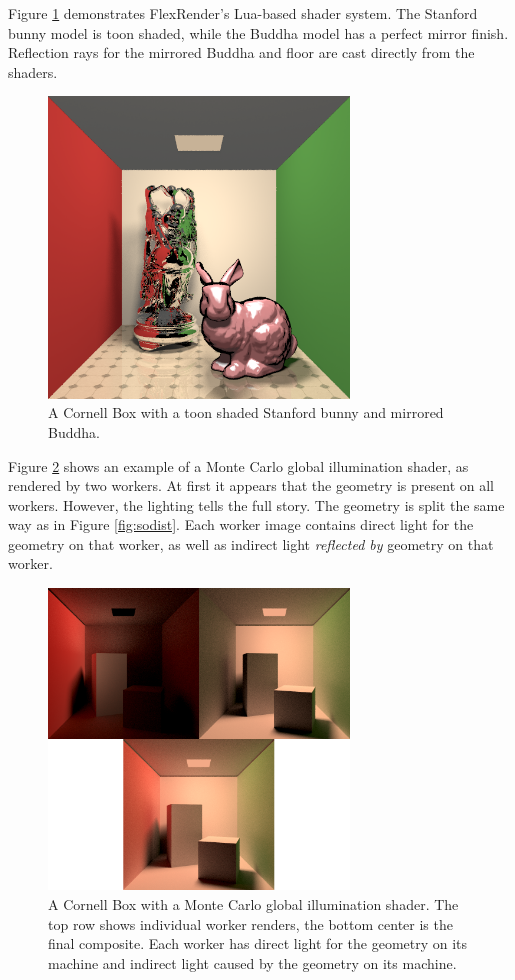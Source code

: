 \documentclass[a4paper,twoside]{article}
\begin{document}
Figure \ref{fig:socornell} demonstrates FlexRender's Lua-based shader system. The
Stanford bunny model is toon shaded, while the Buddha model has a perfect mirror
finish. Reflection rays for the mirrored Buddha and floor are cast directly
from the shaders.

\begin{figure}[h!]
    \centering
    \includegraphics[width=80mm]{showoff/cornell-models.png}
    \caption{A Cornell Box with a toon shaded Stanford bunny and mirrored Buddha.}
    \label{fig:socornell}
\end{figure}

Figure \ref{fig:sogi} shows an example of a Monte Carlo global illumination shader,
as rendered by two workers. At first it appears that the geometry is present on
all workers. However, the lighting tells the full story. The geometry is split
the same way as in Figure \ref{fig:sodist}. Each worker image contains direct
light for the geometry on that worker, as well as indirect light \emph{reflected by}
geometry on that worker.

\begin{figure}[h!]
    \centering
    \includegraphics[width=80mm]{showoff/gi.png}

    \caption{A Cornell Box with a Monte Carlo global illumination shader. The top row shows individual worker renders, the bottom center is the final composite. Each worker has direct light for the geometry on its machine and indirect light caused by the geometry on its machine.}
    \label{fig:sogi}
\end{figure}
\end{document}
